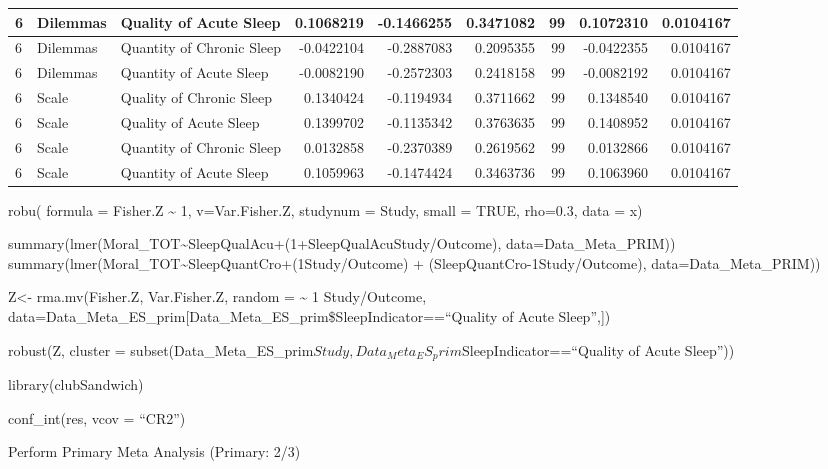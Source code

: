\documentclass[
]{book}
\begin{document}
\begin{tabular}{l|l|l|r|r|r|r|r|r}
\hline
6 & Dilemmas & Quality of Acute Sleep & 0.1068219 & -0.1466255 & 0.3471082 & 99 & 0.1072310 & 0.0104167\\
\hline
6 & Dilemmas & Quantity of Chronic Sleep & -0.0422104 & -0.2887083 & 0.2095355 & 99 & -0.0422355 & 0.0104167\\
\hline
6 & Dilemmas & Quantity of Acute Sleep & -0.0082190 & -0.2572303 & 0.2418158 & 99 & -0.0082192 & 0.0104167\\
\hline
6 & Scale & Quality of Chronic Sleep & 0.1340424 & -0.1194934 & 0.3711662 & 99 & 0.1348540 & 0.0104167\\
\hline
6 & Scale & Quality of Acute Sleep & 0.1399702 & -0.1135342 & 0.3763635 & 99 & 0.1408952 & 0.0104167\\
\hline
6 & Scale & Quantity of Chronic Sleep & 0.0132858 & -0.2370389 & 0.2619562 & 99 & 0.0132866 & 0.0104167\\
\hline
6 & Scale & Quantity of Acute Sleep & 0.1059963 & -0.1474424 & 0.3463736 & 99 & 0.1063960 & 0.0104167\\
\hline
\end{tabular}

robu(
formula = Fisher.Z \textasciitilde{} 1,
v=Var.Fisher.Z,
studynum = Study,
small = TRUE,
rho=0.3,
data = x)

summary(lmer(Moral\_TOT\textasciitilde SleepQualAcu+(1+SleepQualAcu\textbar Study/Outcome), data=Data\_Meta\_PRIM))
summary(lmer(Moral\_TOT\textasciitilde SleepQuantCro+(1\textbar Study/Outcome) + (SleepQuantCro-1\textbar Study/Outcome), data=Data\_Meta\_PRIM))

Z\textless- rma.mv(Fisher.Z, Var.Fisher.Z, random = \textasciitilde{} 1 \textbar Study/Outcome, data=Data\_Meta\_ES\_prim{[}Data\_Meta\_ES\_prim\$SleepIndicator==``Quality of Acute Sleep'',{]})

robust(Z, cluster = subset(Data\_Meta\_ES\_prim\(Study, Data_Meta_ES_prim\)SleepIndicator==``Quality of Acute Sleep''))

library(clubSandwich)

conf\_int(res, vcov = ``CR2'')

Perform Primary Meta Analysis (Primary: 2/3)
\end{document}
